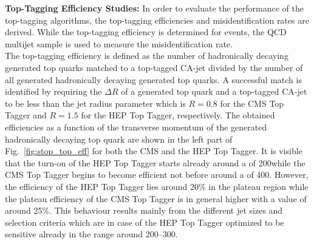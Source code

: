 \begin{description}
\item {\textbf{Top-Tagging Efficiency Studies:}} In order to evaluate the performance of the top-tagging algorithms, the top-tagging efficiencies and misidentification rates are derived. While the top-tagging efficiency is determined for \ttbar events, the QCD multijet sample is used to measure the misidentification rate. \\
The top-tagging efficiency is defined as the number of hadronically decaying generated top quarks matched to a top-tagged CA-jet divided by the number of all generated hadronically decaying generated top quarks. A successful match is identified by requiring the $\Delta R$ of a generated top quark and a top-tagged CA-jet to be less than the jet radius parameter which is $R=0.8$ for the CMS Top Tagger and $R=1.5$ for the HEP Top Tagger, respectively. The obtained efficiencies as a function of the transverse momentum of the generated hadronically decaying top quark are shown in the left part of Fig.~\ref{fig:stop_top_eff} for both the CMS and the HEP Top Tagger. It is visible that the turn-on of the HEP Top Tagger starts already around a \pt of 200\gev while the CMS Top Tagger begins to become efficient not before around a \pt of 400\gev. However, the efficiency of the HEP Top Tagger lies around 20\% in the plateau region while the plateau efficiency of the CMS Top Tagger is in general higher with a value of around 25\%. This behaviour results mainly from the different jet sizes and selection criteria which are in case of the HEP Top Tagger optimized to be sensitive already in the \pt range around 200--300\gev.
\begin{figure}[!t]
  \centering
{}
\end{figure}
\end{description}
